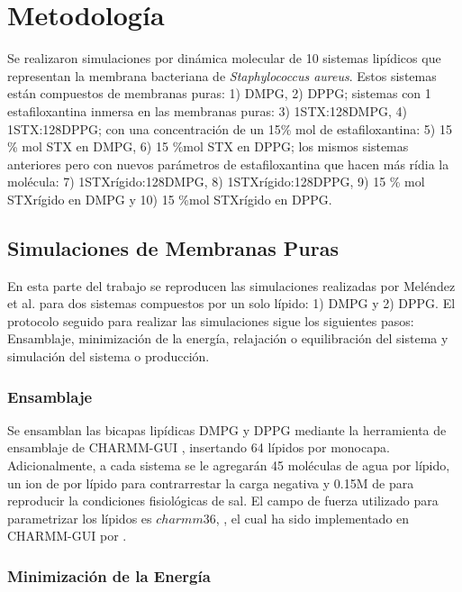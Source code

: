 \chapter{Metodolog\'{i}a}

Se realizaron simulaciones por din\'{a}mica molecular de 10 sistemas lip\'{i}dicos que representan la membrana bacteriana de \textit{Staphylococcus aureus}. Estos sistemas est\'{a}n compuestos de membranas puras: 1) DMPG, 2) DPPG; sistemas con 1 estafiloxantina inmersa en las membranas puras:  3) 1STX:128DMPG,  4) 1STX:128DPPG; con una concentraci\'{o}n de un 15\% mol de estafiloxantina:  5) 15 \%  mol STX  en  DMPG, 6) 15 \%mol STX en DPPG; los mismos sistemas anteriores pero con nuevos par\'{a}metros de estafiloxantina que hacen m\'{a}s r\'{i}dia la mol\'{e}cula: 7) 1STXr\'{i}gido:128DMPG,  8) 1STXr\'{i}gido:128DPPG,  9) 15 \%  mol STXr\'{i}gido  en  DMPG y 10) 15 \%mol STXr\'{i}gido en DPPG. 
\section{Simulaciones de Membranas Puras} \label{sec:mem-pure}
En esta parte del trabajo se reproducen las simulaciones realizadas por Mel\'{e}ndez et al. \cite{Melendez-Delgado2018StudyingBilayers} para  dos sistemas compuestos por un solo l\'{i}pido: 1) DMPG y 2) DPPG. El protocolo seguido para realizar las simulaciones sigue los siguientes pasos: Ensamblaje, minimizaci\'{o}n de la energ\'{i}a, relajaci\'{o}n o equilibraci\'{o}n del sistema y simulaci\'{o}n del sistema o producci\'{o}n. \\


\subsection*{Ensamblaje}

Se ensamblan las bicapas lip\'{i}dicas DMPG y DPPG mediante la herramienta de ensamblaje de CHARMM-GUI \cite{Brooks2009}, insertando 64 l\'{i}pidos por monocapa. Adicionalmente, a cada sistema se le agregar\'{a}n 45 mol\'{e}culas de agua por l\'{i}pido,  un ion de  por l\'{i}pido  para contrarrestar la carga negativa y 0.15M de  para reproducir la condiciones fisiol\'{o}gicas de sal. El campo de fuerza utilizado para parametrizar los l\'{i}pidos es $charmm36$, \cite{Huang2013CHARMM36Data}, el cual ha sido implementado en CHARMM-GUI por \cite{Lee2016CHARMM-GUIField}.\\

\subsection*{Minimizaci\'{o}n de la Energ\'{i}a}

